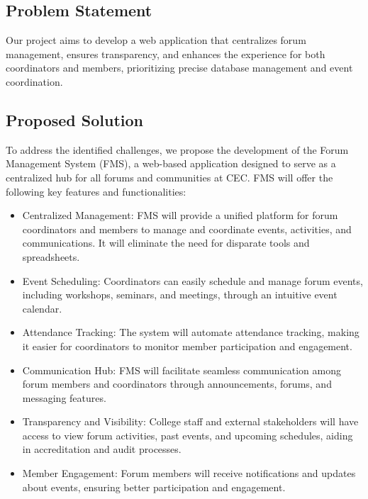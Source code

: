 \documentclass[twocolumn,10pt]{article}
\begin{document}
\subsection{\label{ps}Problem Statement}
Our project aims to develop a web application that centralizes forum management, ensures transparency, and enhances the experience for both coordinators and members, prioritizing precise database management and event coordination.
\subsection{Proposed Solution}
To address the identified challenges, we propose the development of the Forum Management System (FMS), a web-based application designed to serve as a centralized hub for all forums and communities at CEC. FMS will offer the following key features and functionalities:

\begin{itemize}
    

\item Centralized Management: FMS will provide a unified platform for forum coordinators and members to manage and coordinate events, activities, and communications. It will eliminate the need for disparate tools and spreadsheets.

\item Event Scheduling: Coordinators can easily schedule and manage forum events, including workshops, seminars, and meetings, through an intuitive event calendar.

\item Attendance Tracking: The system will automate attendance tracking, making it easier for coordinators to monitor member participation and engagement.

\item Communication Hub: FMS will facilitate seamless communication among forum members and coordinators through announcements, forums, and messaging features.

\item Transparency and Visibility: College staff and external stakeholders will have access to view forum activities, past events, and upcoming schedules, aiding in accreditation and audit processes.

\item Member Engagement: Forum members will receive notifications and updates about events, ensuring better participation and engagement.

\end{itemize}
\end{document}
